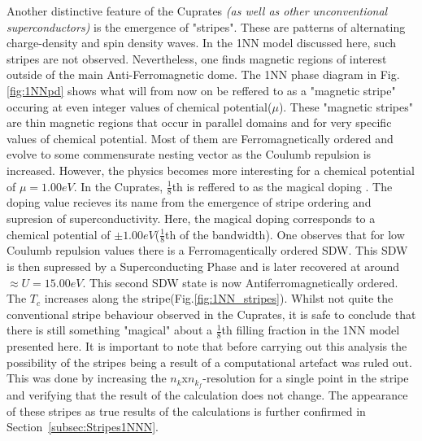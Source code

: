 \documentclass[12pt]{article}
\begin{document}
Another distinctive feature of the Cuprates \textit{(as well as other unconventional superconductors}\cite{levi1998stripes}\textit{)} is the emergence of "stripes". These are patterns of alternating
charge-density and spin density waves\cite{zachar1998landau, vojta2009lattice}. In the 1NN model discussed here, such stripes are not observed. Nevertheless, one finds magnetic regions of interest
outside of the main Anti-Ferromagnetic dome. The 1NN phase diagram in Fig.\ref{fig:1NNpd} shows what will from now on be reffered to as a 
"magnetic stripe" occuring at even integer values of chemical potential($\mu$). 
These "magnetic stripes" are thin magnetic regions that occur in parallel domains and for very specific values of chemical potential.
Most of them are Ferromagnetically ordered and evolve to some commensurate nesting vector as the Coulumb repulsion is increased.  
However, the physics becomes more interesting for a chemical potential of $\mu =1.00eV$. In the Cuprates, $\frac{1}{8}$th is reffered to as the magical doping \cite{komiya2005magic}.
The doping value recieves its name from the emergence of stripe ordering and supresion of superconductivity. Here, the magical doping corresponds to a chemical potential of $\pm 1.00eV$($\frac{1}{8}$th of the bandwidth). 
One observes that for low Coulumb repulsion values there is a Ferromagentically ordered SDW. This SDW is then supressed by a Superconducting Phase and is later recovered at around $\approx U = 15.00eV$. This second SDW state is now
Antiferromagnetically ordered. The $T_c$ increases along the stripe(Fig.\ref{fig:1NN_stripes}). Whilst not quite the conventional stripe behaviour observed in the Cuprates, it is safe to conclude that there is still 
something "magical" about a $\frac{1}{8}$th filling fraction in the 1NN model presented here. It is important to note that
before carrying out this analysis the possibility of the stripes being a result of a computational artefact was ruled out. 
This was done by increasing the $n_k$x$n_{k_f}$-resolution for a single point in the stripe and verifying that the result of the calculation does not change. 
The appearance of these stripes as true results of the calculations is further confirmed in Section~\ref{subsec:Stripes1NNN}. 
\end{document}
